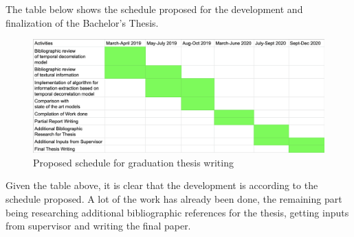 The table below shows the schedule proposed for the development and finalization of the Bachelor's Thesis.
\begin{figure}[H]
    \centering
    \includegraphics[width=1.1\linewidth]{Final-Remarks/tabela.png}
    \caption{Proposed schedule for graduation thesis writing}
    \label{fig:tabela}
\end{figure}

Given the table above, it is clear that the development is according to the schedule proposed. A lot of the work has already been done, the remaining part being researching additional bibliographic references for the thesis, getting inputs from supervisor and writing the final paper.